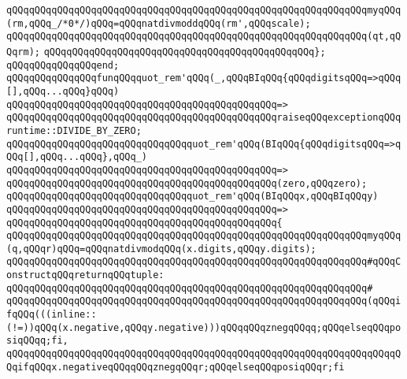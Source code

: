 \verb|qQQqqQQqqQQqqQQqqQQqqQQqqQQqqQQqqQQqqQQqqQQqqQQqqQQqqQQqqQQqqQQqmyqQQq(rm,qQQq_/*0*/)qQQq=qQQqnatdivmoddqQQq(rm',qQQqscale);|\newline
\newline
\verb|qQQqqQQqqQQqqQQqqQQqqQQqqQQqqQQqqQQqqQQqqQQqqQQqqQQqqQQqqQQqqQQq(qt,qQQqrm);|\newline
\verb|qQQqqQQqqQQqqQQqqQQqqQQqqQQqqQQqqQQqqQQqqQQqqQQq};|\newline
\verb|qQQqqQQqqQQqqQQqend;|\newline
\newline
\verb|qQQqqQQqqQQqqQQqfunqQQqquot_rem'qQQq(_,qQQqBIqQQq{qQQqdigitsqQQq=>qQQq[],qQQq...qQQq}qQQq)|\newline
\verb|qQQqqQQqqQQqqQQqqQQqqQQqqQQqqQQqqQQqqQQqqQQqqQQq=>|\newline
\verb|qQQqqQQqqQQqqQQqqQQqqQQqqQQqqQQqqQQqqQQqqQQqqQQqraiseqQQqexceptionqQQqruntime::DIVIDE_BY_ZERO;|\newline
\newline
\verb|qQQqqQQqqQQqqQQqqQQqqQQqqQQqqQQqquot_rem'qQQq(BIqQQq{qQQqdigitsqQQq=>qQQq[],qQQq...qQQq},qQQq_)|\newline
\verb|qQQqqQQqqQQqqQQqqQQqqQQqqQQqqQQqqQQqqQQqqQQqqQQq=>|\newline
\verb|qQQqqQQqqQQqqQQqqQQqqQQqqQQqqQQqqQQqqQQqqQQqqQQq(zero,qQQqzero);|\newline
\newline
\verb|qQQqqQQqqQQqqQQqqQQqqQQqqQQqqQQqquot_rem'qQQq(BIqQQqx,qQQqBIqQQqy)|\newline
\verb|qQQqqQQqqQQqqQQqqQQqqQQqqQQqqQQqqQQqqQQqqQQqqQQq=>|\newline
\verb|qQQqqQQqqQQqqQQqqQQqqQQqqQQqqQQqqQQqqQQqqQQqqQQq{|\newline
\verb|qQQqqQQqqQQqqQQqqQQqqQQqqQQqqQQqqQQqqQQqqQQqqQQqqQQqqQQqqQQqqQQqmyqQQq(q,qQQqr)qQQq=qQQqnatdivmodqQQq(x.digits,qQQqy.digits);|\newline
\newline
\verb|qQQqqQQqqQQqqQQqqQQqqQQqqQQqqQQqqQQqqQQqqQQqqQQqqQQqqQQqqQQqqQQq#qQQqConstructqQQqreturnqQQqtuple:|\newline
\verb|qQQqqQQqqQQqqQQqqQQqqQQqqQQqqQQqqQQqqQQqqQQqqQQqqQQqqQQqqQQqqQQq#|\newline
\verb|qQQqqQQqqQQqqQQqqQQqqQQqqQQqqQQqqQQqqQQqqQQqqQQqqQQqqQQqqQQqqQQq(qQQqifqQQq(((inline::(!=))qQQq(x.negative,qQQqy.negative)))qQQqqQQqznegqQQqq;qQQqelseqQQqposiqQQqq;fi,|\newline
\newline
\verb|qQQqqQQqqQQqqQQqqQQqqQQqqQQqqQQqqQQqqQQqqQQqqQQqqQQqqQQqqQQqqQQqqQQqqQQqifqQQqx.negativeqQQqqQQqznegqQQqr;qQQqelseqQQqposiqQQqr;fi|\newline
